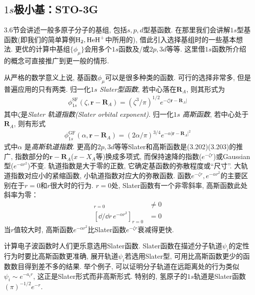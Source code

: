 \subsection{$1s$极小基：STO-3G}
\label{sec3.5.1}
3.6节会讲述一般多原子分子的基组, 包括$s,p,d$型基函数. 
在那里我们会讲解$1s$型基函数(即我们的简单算例$\mathrm{H}_2,\mathrm{HeH}^+$中所用的), 借此引入选择基组时的一些基本想法. 
更优的计算中基组$\{\phi_\mu\}$会用多个$1s$函数及/或$2p,3d$等等. 
这里借$1s$函数所介绍的概念可直接推广到更一般的情形.

从严格的数学意义上说, 
基函数$\phi_\mu$可以是很多种类的函数. 
可行的选择非常多, 
但是普遍应用的只有两类. 
归一化$1s$ \emph{Slater型函数}, 
若中心落在$\mathbf{R}_A$, 
则其形式为
\begin{align}
	\phi_{1s}^\mathrm{SF}(\zeta,\mathbf{r-R}_A) = (\zeta^3/\pi)^{1/2}e^{-\zeta|\mathbf{r-R}_A|}
\end{align}
其中$\zeta$是\emph{Slater 轨道指数(Slater orbital exponent)}. 
归一化$1s$ \emph{高斯函数}, 
若中心处于$\mathbf{R}_A$, 
则有形式
\begin{align}
	\phi_{1s}^\mathrm{GF}(\alpha,\mathbf{r-R}_A) = (2\alpha/\pi)^{3/4}e^{-\alpha|\mathbf{r-R}_A|^2}
\end{align}
式中$\alpha$ 是\emph{高斯轨道指数}. 
更高的$2p,3d$等等Slater和高斯函数是(3.202)(3.203)的推广, 
指数部分的$\mathbf{r-R}_A$($x-X_A$等)换成多项式, 
而保持速降的指数($e^{-\zeta r}$)或Gaussian型($e^{-ar^2}$)不变. 
轨道指数是大于零的正数, 
它确定基函数的弥散程度或``尺寸''. 
大轨道指数对应小的紧缩函数, 
小轨道指数对应大的弥散函数. 
函数$e^{-\zeta r},e^{-\alpha r^2}$的主要区别在于$r=0$和$r$很大时的行为. 
$r=0$处, 
Slater函数有一个非零斜率, 
高斯函数此处斜率为零：
\begin{align}
	[\dd/\dd r\, e^{-\zeta r}]_{r=0}& \neq 0\\
	[\dd/\dd r\, e^{-\alpha r^2}]_{r=0}&  =   0
\end{align}
当$r$值较大时, 
高斯函数$e^{-\alpha r^2}$比Slater函数$e^{-\zeta r}$衰减得更快.


计算电子波函数时人们更乐意选用Slater函数. 
Slater函数在描述分子轨道$\psi_i$的定性行为时要比高斯函数更准确, 
展开轨道$\psi_i$若选用Slater型, 
可用比高斯函数更少的函数数目得到差不多的结果. 
举个例子, 
可以证明分子轨道在远距离处的行为类似$\psi_i\sim e^{-a_ir}$, 
这正是Slater形式而非高斯形式. 
特别的, 
氢原子的$1s$轨道是Slater函数$(\pi)^{-1/2}e^{-r}$.


